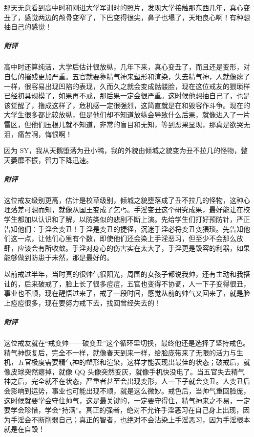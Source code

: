 \begin{case}[变丑]
    那天无意看到高中时和刚进大学军训时的照片，发现大学接触那东西几年，真心变丑了，感觉两边的颅骨变窄了，下巴变得很尖，鼻子也塌了，天地良心啊！有种想抽自己的感觉！
    \subparagraph{附评} 高中时还算纯洁，大学后估计很放纵，几年下来，真心变丑了，而且还是变形，对自信的摧残更加严重。五官就要靠精气神来塑形和渲染，失去精气神，人就像瘪了一样，很容易出现凹陷的表现，久而久之就会变成骷髅脸，现在这位戒友的猥琐样已经初具规模了，如果再不戒，那后果一定会很严重。这时候他想抽自己了，也是该觉醒了，撸成这样了，危机感一定很强烈，这简直就是在和毁容作斗争。现在的大学生很多都比较放纵，但是他们却不知道放纵会导致什么后果，就像进入了一片雷区，但他们压根儿就不知道，非常的盲目和无知，等到恶果显现，那真是欲哭无泪，痛苦啊，悔恨啊！
\end{case}

\begin{case}[变丑]
    因为 SY，我从天鹅堕落为丑小鸭，我的外貌由倾城之貌变为丑不拉几的怪物，整天萎靡不振，智力下降迅速。
    \subparagraph{附评} 这位戒友级别更高，估计是校草级别，倾城之貌堕落成了丑不拉几的怪物，这种心理落差可想而知，就像从国王变成了乞丐。手淫变丑这个研究成果，最好能让在校学生都加以认识和了解，以防类似的悲剧不断上演。先给学生们打好预防针，严正告知他们：手淫会变丑！手淫是变丑的捷径，沉迷手淫必将变丑变猥琐。先告知他们这一点，让他们心里有个数，即使他们还会染上手淫恶习，但至少不会那么放肆，应该会有所收敛。手淫对身心的伤害实在太大了，手淫更是毁容的利器，如果能够做到防患于未然，那是最好的。
\end{case}

\begin{case}[变丑]
    以前戒过半年，当时真的很帅气很阳光，周围的女孩子都说我帅，还有主动和我搭讪的，后来破戒了，脸上长了很多痘痘，五官也变得不协调，人一下子变得很丑，事业也不顺，现在醒悟过来了，戒了一段时间，感觉从前的帅气又回来了，就是脸上痘痘很多，现在要努力戒下去，找回曾经失去的！
    \subparagraph{附评} 这位戒友就在“戒变帅——破变丑”这个循环里切换，最终他还是选择了坚持戒色。精气神恢复后，完全不一样，就像春天到来一样，给脸庞带来了无限的活力与生机，五官极度需要精气神的塑形和渲染，这样才能表现出最佳的状态；破戒后，就像皮球突然瘪掉，就像 QQ 头像突然变灰，就像手机快没电了。当五官失去精气神之后，完全就不在状态，严重者甚至会出现变形，人一下子就会变丑。人变丑后会影响到运势，事业也可能出现不顺，就是这么微妙。戒色后，当帅气重回脸庞，这时候就要学会守住帅气，这是最关键的，一定要守得住，精气神来之不易，一定要学会珍惜，学会“持满”。真正的强者，绝对不允许手淫恶习在自己身上出现，因为手淫会不断削弱自己；真正的智者，也绝对不会沾染上手淫恶习，因为手淫根本就是在自毁！
\end{case}

